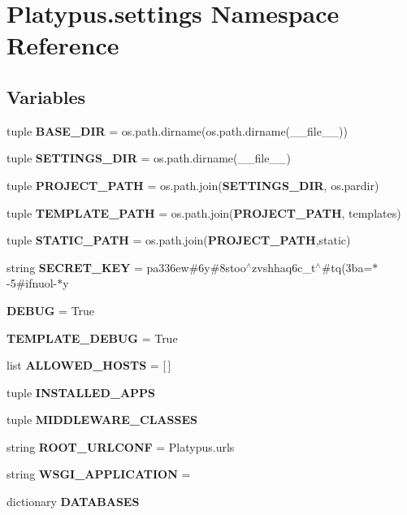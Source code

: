 \section{Platypus.\+settings Namespace Reference}
\label{namespace_platypus_1_1settings}
\subsection*{Variables}
\begin{DoxyCompactItemize}
\item 
tuple {\bf B\+A\+S\+E\+\_\+\+D\+I\+R} = os.\+path.\+dirname(os.\+path.\+dirname(\+\_\+\+\_\+file\+\_\+\+\_\+))
\item 
tuple {\bf S\+E\+T\+T\+I\+N\+G\+S\+\_\+\+D\+I\+R} = os.\+path.\+dirname(\+\_\+\+\_\+file\+\_\+\+\_\+)
\item 
tuple {\bf P\+R\+O\+J\+E\+C\+T\+\_\+\+P\+A\+T\+H} = os.\+path.\+join({\bf S\+E\+T\+T\+I\+N\+G\+S\+\_\+\+D\+I\+R}, os.\+pardir)
\item 
tuple {\bf T\+E\+M\+P\+L\+A\+T\+E\+\_\+\+P\+A\+T\+H} = os.\+path.\+join({\bf P\+R\+O\+J\+E\+C\+T\+\_\+\+P\+A\+T\+H}, \textquotesingle{}templates\textquotesingle{})
\item 
tuple {\bf S\+T\+A\+T\+I\+C\+\_\+\+P\+A\+T\+H} = os.\+path.\+join({\bf P\+R\+O\+J\+E\+C\+T\+\_\+\+P\+A\+T\+H},\textquotesingle{}static\textquotesingle{})
\item 
string {\bf S\+E\+C\+R\+E\+T\+\_\+\+K\+E\+Y} = \textquotesingle{}pa336ew\#6y\#8stoo$^\wedge$zvshhaq6c\+\_\+t$^\wedge$\#tq(3ba=$\ast$-\/5\#ifnuol-\/$\ast$y\textquotesingle{}
\item 
{\bf D\+E\+B\+U\+G} = True
\item 
{\bf T\+E\+M\+P\+L\+A\+T\+E\+\_\+\+D\+E\+B\+U\+G} = True
\item 
list {\bf A\+L\+L\+O\+W\+E\+D\+\_\+\+H\+O\+S\+T\+S} = [$\,$]
\item 
tuple {\bf I\+N\+S\+T\+A\+L\+L\+E\+D\+\_\+\+A\+P\+P\+S}
\item 
tuple {\bf M\+I\+D\+D\+L\+E\+W\+A\+R\+E\+\_\+\+C\+L\+A\+S\+S\+E\+S}
\item 
string {\bf R\+O\+O\+T\+\_\+\+U\+R\+L\+C\+O\+N\+F} = \textquotesingle{}Platypus.\+urls\textquotesingle{}
\item 
string {\bf W\+S\+G\+I\+\_\+\+A\+P\+P\+L\+I\+C\+A\+T\+I\+O\+N} = \textquotesingle{}
\item 
dictionary {\bf D\+A\+T\+A\+B\+A\+S\+E\+S}
\item 

\end{DoxyCompactItemize}
